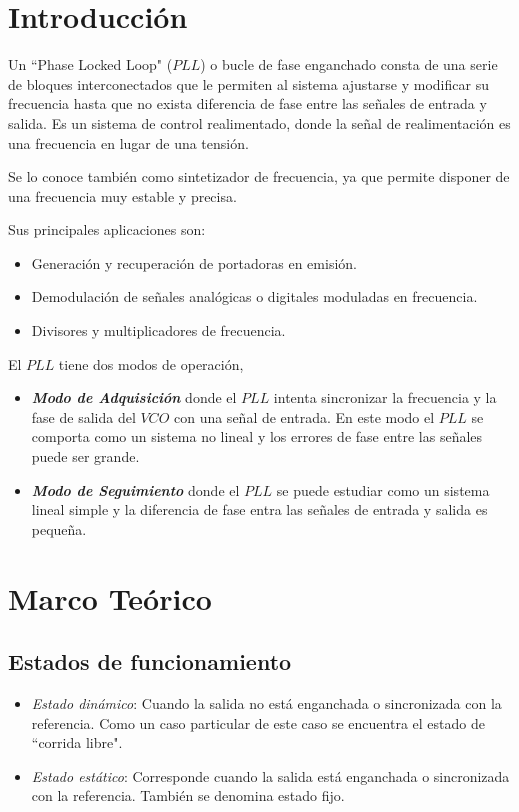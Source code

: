 \documentclass[twocolumn]{article}
\begin{document}
\onecolumn
\tableofcontents
\clearpage

\twocolumn
\section{Introducción}
Un ``Phase Locked Loop" ($PLL$) o bucle de fase enganchado consta de una serie de bloques interconectados que le permiten al sistema ajustarse y modificar su frecuencia hasta que no exista diferencia de fase entre las señales de entrada y salida. Es un sistema de control realimentado, donde la señal de realimentación es una frecuencia en lugar de una tensión. 

Se lo conoce también como sintetizador de frecuencia, ya que permite disponer de una frecuencia muy estable y precisa.

Sus principales aplicaciones son:
\begin{itemize}\itemsep0em
	\item Generación y recuperación de portadoras en emisión.
	\item Demodulación de señales analógicas o digitales moduladas en frecuencia. 
	\item Divisores y multiplicadores de frecuencia.
\end{itemize}

El $PLL$ tiene dos modos de operación,
\begin{itemize}
	\item \textbf{\textit{Modo de Adquisición}} donde el $PLL$ intenta sincronizar la frecuencia y la fase de salida del $VCO$ con una señal de entrada. En este modo el $PLL$ se comporta como un sistema no lineal y los errores de fase entre las señales puede ser grande.
	\item \textbf{\textit{Modo de Seguimiento}} donde el $PLL$ se puede estudiar como un sistema lineal simple y la diferencia de fase entra las señales de entrada y salida es pequeña. 
\end{itemize}

\section{Marco Teórico}
\subsection{Estados de funcionamiento}
\begin{itemize}
	\item \textit{Estado dinámico}: Cuando la salida no está enganchada o sincronizada con la referencia. Como un caso particular de este caso se encuentra el estado de ``corrida libre".
	\item \textit{Estado estático}: Corresponde cuando la salida está enganchada o sincronizada con la referencia. También se denomina estado fijo. 
\end{itemize}
\end{document}

